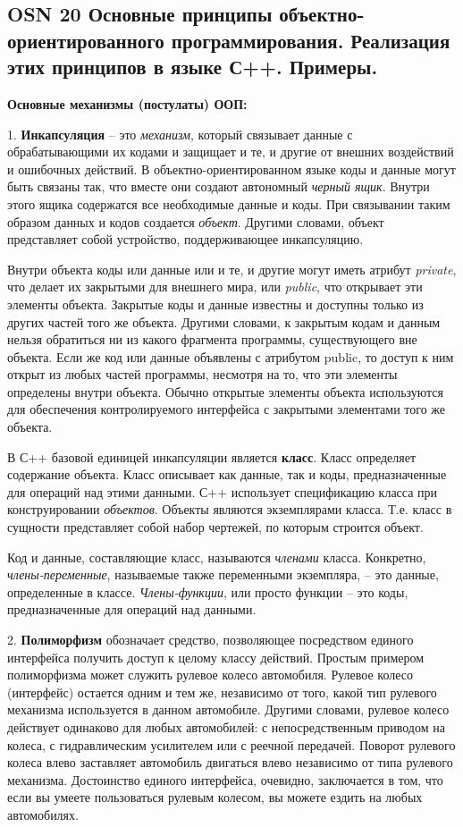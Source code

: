 \subsection*{OSN 20 Основные принципы объектно-ориентированного программирования. Реализация этих принципов в языке С++. Примеры.}


\centerline{\textbf{Основные механизмы (постулаты) ООП:}}

1. \textbf{Инкапсуляция} -- это \textit{механизм}, который связывает данные с обрабатывающими их кодами и защищает и те, и другие от внешних воздействий и ошибочных действий. В объектно-ориентированном языке коды и данные могут быть связаны так, что вместе они создают автономный \textit{черный ящик}. Внутри этого ящика содержатся все необходимые данные и коды. При связывании таким образом данных и кодов создается \textit{объект}. Другими словами, объект представляет собой устройство, поддерживающее инкапсуляцию.
    
Внутри объекта коды или данные или и те, и другие могут иметь атрибут \textit{private}, что делает их закрытыми для внешнего мира, или \textit{public}, что открывает эти элементы объекта. Закрытые коды и данные известны и доступны только из других частей того же объекта. Другими словами, к закрытым кодам и данным нельзя обратиться ни из какого фрагмента программы, существующего вне объекта. Если же код или данные объявлены с атрибутом public, то доступ к ним открыт из любых частей программы, несмотря на то, что эти элементы определены внутри объекта. Обычно открытые элементы объекта используются для обеспечения контролируемого интерфейса с закрытыми элементами того же объекта.
    
В С++ базовой единицей инкапсуляции является \textbf{класс}. Класс определяет содержание объекта. Класс описывает как данные, так и коды, предназначенные для операций над этими данными. С++ использует спецификацию класса при конструировании \textit{объектов}. Объекты являются экземплярами класса. Т.е. класс в сущности представляет собой набор чертежей, по которым строится объект.
    
Код и данные, составляющие класс, называются \textit{членами} класса. Конкретно, \textit{члены-переменные}, называемые также переменными экземпляра, -- это данные, определенные в классе. \textit{Члены-функции}, или просто функции -- это коды, предназначенные для операций над данными.
    
2. \textbf{Полиморфизм} обозначает средство, позволяющее посредством единого интерфейса получить доступ к целому классу действий. Простым примером полиморфизма может служить рулевое колесо автомобиля. Рулевое колесо (интерфейс) остается одним и тем же, независимо от того, какой тип рулевого механизма используется в данном автомобиле. Другими словами, рулевое колесо действует одинаково для любых автомобилей: с непосредственным приводом на колеса, с гидравлическим усилителем или с реечной передачей. Поворот рулевого колеса влево заставляет автомобиль двигаться влево независимо от типа рулевого механизма. Достоинство единого интерфейса, очевидно, заключается в том, что если вы умеете пользоваться рулевым колесом, вы можете ездить на любых автомобилях.
    
